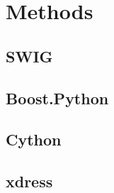 
\section{Methods} \label{sec:methods}

  \subsection{SWIG} \label{sub:swig}

    \blindtext

  \subsection{Boost.Python} \label{sub:boost_python}

    \blindtext

  \subsection{Cython} \label{sub:cython}

    \blindtext

  \subsection{xdress} \label{sub:xdress}

    \blindtext
